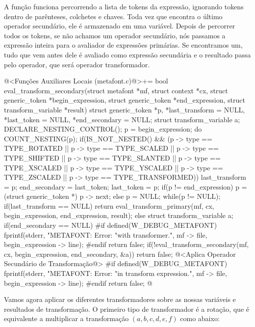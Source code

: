 A função funciona percorrendo a lista de tokens da expressão,
ignorando tokens dentro de parênteses, colchetes e chaves. Toda vez
que encontra o último operador secundário, ele é armazenado em uma
variável. Depois de percorrer todos os tokens, se não achamos um
operador secundário, nós passamos a expressão inteira para o avaliador
de expressões primárias. Se encontramos um, tudo que vem antes dele é
avaliado como expressão secundária e o resultado passa pelo operador,
que será operador transformador.

\iniciocodigo
@<Funções Auxiliares Locais (metafont.c)@>+=
bool eval_transform_secondary(struct metafont *mf, struct context *cx,
                              struct generic_token *begin_expression,
                              struct generic_token *end_expression,
                              struct transform_variable *result){
  struct generic_token *p, *last_transform = NULL, *last_token = NULL,
                       *end_secondary = NULL;
  struct transform_variable a;
  DECLARE_NESTING_CONTROL();
  p = begin_expression;
  do{
    COUNT_NESTING(p);
    if(IS_NOT_NESTED() &&
       (p -> type == TYPE_ROTATED || p -> type == TYPE_SCALED ||
        p -> type == TYPE_SHIFTED || p -> type == TYPE_SLANTED ||
        p -> type == TYPE_XSCALED || p -> type == TYPE_YSCALED ||
        p -> type == TYPE_ZSCALED || p -> type == TYPE_TRANSFORMED)){
      last_transform = p;
      end_secondary = last_token;
    }
    last_token = p;
    if(p != end_expression)
      p = (struct generic_token *) p -> next;
    else
      p = NULL;
  } while(p != NULL);
  if(last_transform == NULL)
    return eval_transform_primary(mf, cx, begin_expression, end_expression,
                                  result);
  else{
    struct transform_variable a;
    if(end_secondary == NULL){
#if defined(W_DEBUG_METAFONT)
      fprintf(stderr, "METAFONT: Error: %
              "with transformer.",  mf -> file, begin_expression -> line);
#endif
      return false;
    }
    if(!eval_transform_secondary(mf, cx, begin_expression, end_secondary, &a))
      return false;
    @<Aplica Operador Secundário de Transformação@>
#if defined(W_DEBUG_METAFONT)
    fprintf(stderr, "METAFONT: Error: %
            "in transform expression.",  mf -> file, begin_expression -> line);
#endif
    return false;
  }
}
@
\fimcodigo

Vamos agora aplicar os diferentes transformadores sobre as nossas
variáveis e resultados de transformação. O primeiro tipo de
transformador é a rotação, que é equivalente a multiplicar a
transformação $(a, b, c, d, e, f)$ como abaixo:

